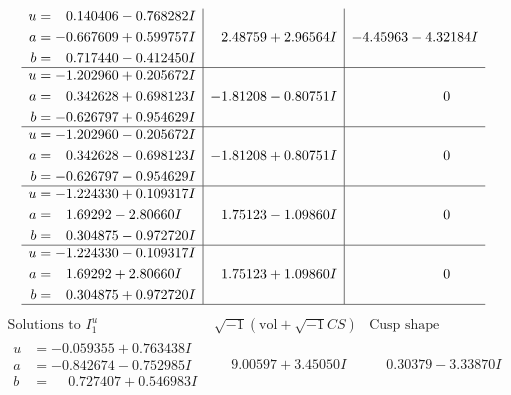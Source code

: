 \documentclass[1p]{elsarticle_modified}
\theoremstyle{definition}
\newcommand{\I}{\sqrt{-1}}
\begin{document}
$$\begin{array}{c|c|c}
\begin{aligned}
u &= \phantom{-}0.140406 - 0.768282 I \\
a &= -0.667609 + 0.599757 I \\
b &= \phantom{-}0.717440 - 0.412450 I\end{aligned}
 & \phantom{-}2.48759 + 2.96564 I & -4.45963 - 4.32184 I \\ \hline\begin{aligned}
u &= -1.202960 + 0.205672 I \\
a &= \phantom{-}0.342628 + 0.698123 I \\
b &= -0.626797 + 0.954629 I\end{aligned}
 & -1.81208 - 0.80751 I & \phantom{-0.000000 } 0 \\ \hline\begin{aligned}
u &= -1.202960 - 0.205672 I \\
a &= \phantom{-}0.342628 - 0.698123 I \\
b &= -0.626797 - 0.954629 I\end{aligned}
 & -1.81208 + 0.80751 I & \phantom{-0.000000 } 0 \\ \hline\begin{aligned}
u &= -1.224330 + 0.109317 I \\
a &= \phantom{-}1.69292 - 2.80660 I \\
b &= \phantom{-}0.304875 - 0.972720 I\end{aligned}
 & \phantom{-}1.75123 - 1.09860 I & \phantom{-0.000000 } 0 \\ \hline\begin{aligned}
u &= -1.224330 - 0.109317 I \\
a &= \phantom{-}1.69292 + 2.80660 I \\
b &= \phantom{-}0.304875 + 0.972720 I\end{aligned}
 & \phantom{-}1.75123 + 1.09860 I & \phantom{-0.000000 } 0\\
 \hline 
 \end{array}$$\newpage$$\begin{array}{c|c|c}  
\text{Solutions to }I^u_{1}& \I (\text{vol} + \sqrt{-1}CS) & \text{Cusp shape}\\
 \hline 
\begin{aligned}
u &= -0.059355 + 0.763438 I \\
a &= -0.842674 - 0.752985 I \\
b &= \phantom{-}0.727407 + 0.546983 I\end{aligned}
 & \phantom{-}9.00597 + 3.45050 I & \phantom{-}0.30379 - 3.33870 I \\ \hline\begin{aligned}

\end{aligned}
\end{array}$$
\end{document}
